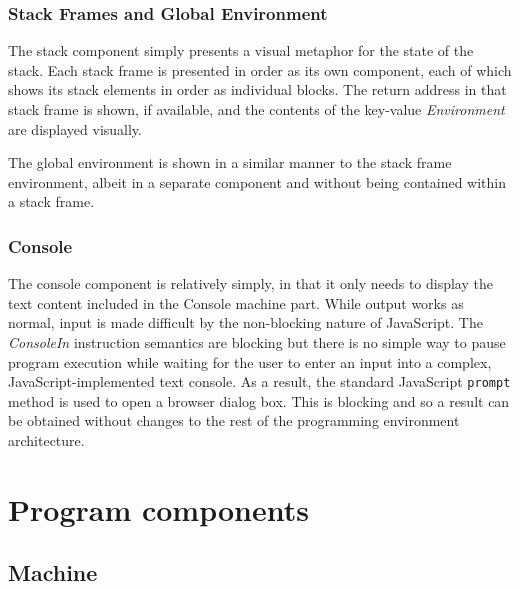 \subsubsection{Stack Frames and Global Environment}

The stack component simply presents a visual metaphor for the state of the stack. Each stack frame is presented in order as its own component, each of which shows its stack elements in order as individual blocks. The return address in that stack frame is shown, if available, and the contents of the key-value \textit{Environment} are displayed visually.

The global environment is shown in a similar manner to the stack frame environment, albeit in a separate component and without being contained within a stack frame.

\subsubsection{Console}

The console component is relatively simply, in that it only needs to display the text content included in the Console machine part. While output works as normal, input is made difficult by the non-blocking nature of JavaScript. The \textit{ConsoleIn} instruction semantics are blocking but there is no simple way to pause program execution while waiting for the user to enter an input into a complex, JavaScript-implemented text console. As a result, the standard JavaScript \verb+prompt+ method is used to open a browser dialog box. This is blocking and so a result can be obtained without changes to the rest of the programming environment architecture.

\section{Program components}

\subsection{Machine}

